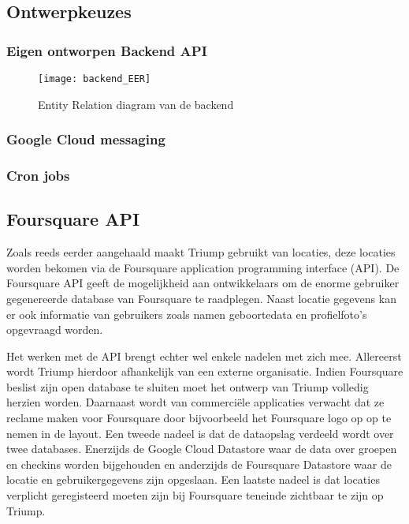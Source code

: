 \subsection{Ontwerpkeuzes}

\subsubsection{Eigen ontworpen Backend API}

\begin{figure}[H]
	\texttt{[image: backend\_EER]}
	\caption{Entity Relation diagram van de backend}
	\label{fig:Backend ER}
\end{figure}

\subsubsection{Google Cloud messaging}

\subsubsection{Cron jobs}




\subsection{Foursquare API}

Zoals reeds eerder aangehaald maakt Triump gebruikt van locaties, deze locaties worden bekomen via de Foursquare application programming interface (API). De Foursquare API geeft de mogelijkheid aan ontwikkelaars om de enorme gebruiker gegenereerde database van Foursquare te raadplegen. Naast locatie gegevens kan er ook informatie van gebruikers zoals namen geboortedata en profielfoto's opgevraagd worden. 

Het werken met de API brengt echter wel enkele nadelen met zich mee.
Allereerst wordt Triump hierdoor afhankelijk van een externe organisatie. Indien Foursquare beslist zijn open database te sluiten moet het ontwerp van Triump volledig herzien worden. Daarnaast wordt van commerciële applicaties verwacht dat ze reclame maken voor Foursquare door bijvoorbeeld het Foursquare logo op op te nemen in de layout.  Een tweede nadeel is dat de dataopslag verdeeld wordt over twee databases. Enerzijds de Google Cloud Datastore waar de data over groepen en checkins worden bijgehouden en anderzijds de Foursquare Datastore waar de locatie en gebruikergegevens zijn opgeslaan. Een laatste nadeel is dat locaties verplicht geregisteerd moeten zijn bij Foursquare teneinde zichtbaar te zijn op Triump. 

